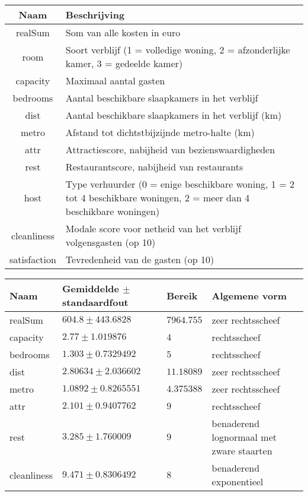 \documentclass[a4paper]{kulakarticle}
\begin{document}
\begin{tabular}{c|p{10cm}}
	
	\raggedright
	Naam & Beschrijving\\
	\hline
	
	realSum & Som van alle kosten in euro\\ 
	room & Soort verblijf (1 = volledige woning, 2 = afzonderlijke kamer, 
	3 = gedeelde kamer) \\ 
	capacity & Maximaal aantal gasten \\
	bedrooms & Aantal beschikbare slaapkamers in het verblijf \\
	dist & Aantal beschikbare slaapkamers in het verblijf (km) \\
	metro & Afstand tot dichtstbijzijnde metro-halte (km)\\
	attr & Attractiescore, nabijheid van bezienswaardigheden \\
	rest & Restaurantscore, nabijheid van restaurants \\ 
	host & Type verhuurder (0 = enige beschikbare woning, 1 = 2 tot 4 beschikbare woningen,
	2 = meer dan 4 beschikbare woningen) \\ 
	cleanliness & Modale score voor netheid van het verblijf volgensgasten (op 10) \\
	
	satisfaction & Tevredenheid van de gasten (op 10)\\
	
	
\end{tabular}
\vspace{1cm}

\begin{center}
	\begin{tabular}{| l| l| l|  p{5cm} |}
		\hline
		Naam & Gemiddelde $\pm$ standaardfout  & Bereik & Algemene vorm\\  [0.5ex]
		\hline\hline
		realSum & $604.8\pm 443.6828 $ & $7964.755$  &  zeer rechtsscheef\\   
		\hline
		capacity & $2.77\pm 1.019876$ & $4$  & rechtsscheef \\
		\hline
		bedrooms & $1.303\pm 0.7329492$ & $5$ & rechtsscheef \\
		\hline
		dist & $2.80634\pm 2.036602$  & $11.18089$ & zeer rechtsscheef \\ [1ex] 
		\hline
		metro & $1.0892\pm 0.8265551$ & $4.375388$ & zeer rechtsscheef \\ [1ex] 
		\hline
		attr & $2.101\pm 0.9407762$ & $9$  & rechtsscheef \\ [1ex] 
		\hline
		rest & $3.285\pm 1.760009$ & $9$ & benaderend lognormaal met zware staarten \\ [1ex] 
		\hline
		cleanliness & $9.471\pm 0.8306492$ & $8$ & benaderend exponentieel  \\ [1ex] 
		\hline
	\end{tabular}
\end{center}
	
\end{document}
